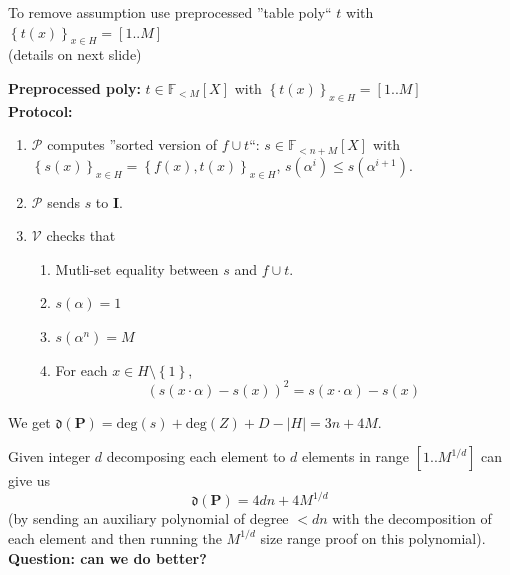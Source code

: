 \documentclass[shadesubsections,compress,14pt,mathserif]{beamer}
\newcommand{\prot}{\mathbf{P}}
\newcommand{\aggdeg}[1]{\mathfrak{d}(#1)}
\renewcommand{\deg}{\mathrm{deg}}
\newcommand{\F}{\ensuremath{\mathbb F}}
\newcommand{\set}[1]{\ensuremath{\left\{#1\right\}}}
\newcommand{\sett}[2]{\ensuremath{\left\{#1\right\}_{#2}}}
\newcommand{\ver}{\ensuremath{\mathcal{V}}}
\newcommand{\prv}{\ensuremath{\mathcal{P}}}
\newcommand{\polysofdeg}[1]{\F_{< #1}[X]}
\newcommand{\ideal}{\mathbf{I}}
\begin{document}
\begin{frame}
To remove assumption use preprocessed ''table poly`` $t$ with $\sett{t(x)}{x\in H}=[1..M]$\\
(details on next slide)
 \vspace{0.2in}



\end{frame}

\begin{frame}

\textbf{Preprocessed poly:} $t\in \polysofdeg{M}$ with $\sett{t(x)}{x\in H}=[1..M]$ \\ \pause
\textbf{Protocol:}
 \begin{enumerate}
 \item $\prv$ computes ''sorted version of $f\cup t$``: $s\in \polysofdeg{n+M}$ with
 $\sett{s(x)}{x\in H}=\sett{f(x),t(x)}{x\in H}$, $s(\alpha^i)\leq s(\alpha^{i+1})$.\pause
 \item $\prv$ sends $s$ to $\ideal$.\pause
 \item $\ver$ checks that
 \begin{enumerate}
  \item Mutli-set equality between $s$ and $f\cup t$.\pause
  \item $s(\alpha)=1$
  \item $s(\alpha^n) = M$
  \item For each $x\in H\setminus \set{1}$,\pause
  \[ (s(x\cdot \alpha) - s(x))^2 = s(x\cdot \alpha) - s(x)\]
 \end{enumerate}

\end{enumerate}


We get $\aggdeg{\prot}= \deg(s)+\deg(Z)+D-|H| = 3n+4M$.
\end{frame}
\begin{frame}
Given integer $d$ decomposing each element to $d$ elements in range $[1..M^{1/d}]$ can 
give us $$\aggdeg{\prot} = 4dn+4M^{1/d}$$(by sending an auxiliary polynomial of degree $<dn$ with the decomposition of each element and then running the $M^{1/d}$ size range proof on this polynomial).\\

 \vspace{0.2in}
\textbf{Question: can we do better?}


\end{frame}
\end{document}
